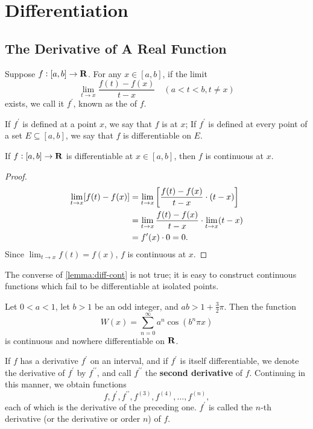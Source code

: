 \chapter{Differentiation}\label{chap:differentiation}
\section{The Derivative of A Real Function}
\begin{definition}[Derivative]
Suppose $f:[a,b]\to\mathbf R$. For any $x\in[a,b]$, if the limit
\[\lim_{t\to x}\frac{f(t)-f(x)}{t-x}\quad(a<t<b,t\neq x)\]
exists, we call it $f^\prime$, known as the  of $f$.

If $f^\prime$ is defined at a point $x$, we say that $f$ is  at $x$; If $f^\prime$ is defined at every point of a set $E\subseteq[a,b]$, we say that $f$ is differentiable on $E$.
\end{definition}

\begin{lemma}\label{lemma:diff-cont}
If $f:[a,b]\to\mathbf R$ is differentiable at $x\in[a,b]$, then $f$ is continuous at $x$.
\end{lemma}

\begin{proof}
\begin{align*}
\lim_{t\to x}[f(t)-f(x)]
&=\lim_{t\to x}\left[\frac{f(t)-f(x)}{t-x}\cdot(t-x)\right]\\
&=\lim_{t\to x}\frac{f(t)-f(x)}{t-x}\cdot\lim_{t\to x}(t-x)\\
&=f^\prime(x)\cdot0=0.
\end{align*}
Since $\displaystyle\lim_{t\to x}f(t)=f(x)$, $f$ is continuous at $x$.
\end{proof}

\begin{remark}
The converse of \cref{lemma:diff-cont} is not true; it is easy to construct continuous functions which fail to be differentiable at isolated points.
\end{remark}

\begin{example}
Let $0<a<1$, let $b>1$ be an odd integer, and $ab>1+\frac{3}{2}\pi$. Then the function
\[W(x)=\sum_{n=0}^{\infty}a^n\cos(b^n\pi x)\]
is continuous and nowhere differentiable on $\mathbf R$.
\end{example}

\begin{notation}
If $f$ has a derivative $f^\prime$ on an interval, and if $f^\prime$ is itself differentiable, we denote the derivative of $f^\prime$ by $f^{\prime\prime}$, and call $f^{\prime\prime}$ the \textbf{second derivative} of $f$. Continuing in this manner, we obtain functions
\[f,f^\prime,f^{\prime\prime},f^{(3)},f^{(4)},\dots,f^{(n)},\]
each of which is the derivative of the preceding one. $f^\prime$ is called the $n$-th derivative (or the derivative or order $n$) of $f$.
\end{notation}

